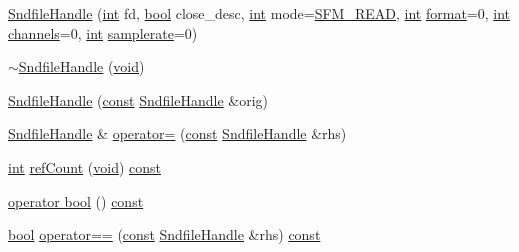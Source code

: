 \begin{DoxyCompactItemize}
\item 
\hyperlink{class_sndfile_handle_a3cbcef78befb00c3ad7391754a9c0343}{Sndfile\+Handle} (\hyperlink{xmltok_8h_a5a0d4a5641ce434f1d23533f2b2e6653}{int} fd, \hyperlink{mac_2config_2i386_2lib-src_2libsoxr_2soxr-config_8h_abb452686968e48b67397da5f97445f5b}{bool} close\+\_\+desc, \hyperlink{xmltok_8h_a5a0d4a5641ce434f1d23533f2b2e6653}{int} mode=\hyperlink{win_2_projects_2libsndfile_2sndfile_8h_a893dbd60c5ebe415600523fbae202880a125531fe9c895237bccd35736370e815}{S\+F\+M\+\_\+\+R\+E\+AD}, \hyperlink{xmltok_8h_a5a0d4a5641ce434f1d23533f2b2e6653}{int} \hyperlink{class_sndfile_handle_afb31af9b5abeb6e0fec464a3fe60c906}{format}=0, \hyperlink{xmltok_8h_a5a0d4a5641ce434f1d23533f2b2e6653}{int} \hyperlink{class_sndfile_handle_a81d6738501e66fc7a12469c4ec1608bf}{channels}=0, \hyperlink{xmltok_8h_a5a0d4a5641ce434f1d23533f2b2e6653}{int} \hyperlink{class_sndfile_handle_a35bc814b03ba0cb72a78ce83204a1f87}{samplerate}=0)
\item 
\hyperlink{class_sndfile_handle_a64618c3e3c7537b621a9a00b4db18168}{$\sim$\+Sndfile\+Handle} (\hyperlink{sound_8c_ae35f5844602719cf66324f4de2a658b3}{void})
\item 
\hyperlink{class_sndfile_handle_af9c8bc95a16a9cc913586623c29a3bcd}{Sndfile\+Handle} (\hyperlink{getopt1_8c_a2c212835823e3c54a8ab6d95c652660e}{const} \hyperlink{class_sndfile_handle}{Sndfile\+Handle} \&orig)
\item 
\hyperlink{class_sndfile_handle}{Sndfile\+Handle} \& \hyperlink{class_sndfile_handle_af7f77c3dbd655daed9648b702329ca86}{operator=} (\hyperlink{getopt1_8c_a2c212835823e3c54a8ab6d95c652660e}{const} \hyperlink{class_sndfile_handle}{Sndfile\+Handle} \&rhs)
\item 
\hyperlink{xmltok_8h_a5a0d4a5641ce434f1d23533f2b2e6653}{int} \hyperlink{class_sndfile_handle_a8022e94042b3a51062c1217c7cb7f5db}{ref\+Count} (\hyperlink{sound_8c_ae35f5844602719cf66324f4de2a658b3}{void}) \hyperlink{getopt1_8c_a2c212835823e3c54a8ab6d95c652660e}{const} 
\item 
\hyperlink{class_sndfile_handle_a0fe936d2c43b77f93b263a57cbc85821}{operator bool} () \hyperlink{getopt1_8c_a2c212835823e3c54a8ab6d95c652660e}{const} 
\item 
\hyperlink{mac_2config_2i386_2lib-src_2libsoxr_2soxr-config_8h_abb452686968e48b67397da5f97445f5b}{bool} \hyperlink{class_sndfile_handle_a3a77ab42a81b4e6bf38411c717affa82}{operator==} (\hyperlink{getopt1_8c_a2c212835823e3c54a8ab6d95c652660e}{const} \hyperlink{class_sndfile_handle}{Sndfile\+Handle} \&rhs) \hyperlink{getopt1_8c_a2c212835823e3c54a8ab6d95c652660e}{const} 

\end{DoxyCompactItemize}
